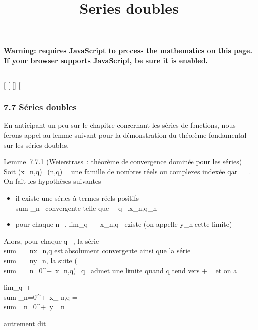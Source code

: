 \documentclass[]{article}
\title{Series doubles}
\author{}
\date{}
\begin{document}
\maketitle

\textbf{Warning: 
requires JavaScript to process the mathematics on this page.\\ If your
browser supports JavaScript, be sure it is enabled.}

\begin{center}\rule{3in}{0.4pt}\end{center}

[
[
[]
[

\subsubsection{7.7 Séries doubles}

En anticipant un peu sur le chapitre concernant les séries de fonctions,
nous ferons appel au lemme suivant pour la démonstration du théorème
fondamental sur les séries doubles.

Lemme~7.7.1 (Weierstrass~: théorème de convergence dominée pour les
séries) Soit (x_n,q)_(n,q)\in{}~\times{}~ une famille de nombres
réels ou complexes indexée qar ~ \times {}~. On fait les hypothèses suivantes

\begin{itemize}
\itemsep1pt\parskip0pt
\item
  il existe une séries à termes réels positifs
  \\sum  \alpha_n~
  convergente telle que \forall~~q \in
  ~,x_n,q\leq \alpha_n
\item
  pour chaque n \in {}~,
  lim_q\rightarrow~+\infty~x_n,q~ existe (on
  appelle y_n cette limite)
\end{itemize}

Alors, pour chaque q \in {}~, la série
\\sum ~
_nx_n,q est absolument convergente ainsi que la série
\\sum ~
_ny_n, la suite \left
(\\sum ~
_n=0^+\infty~x_n,q\right )_q\in{}~
admet une limite quand q tend vers + \infty~ et on a

lim_q\rightarrow~+\infty~~\\sum
_n=0^+\infty~x_ n,q = \\sum
_n=0^+\infty~y_ n

autrement dit
\end{document}
